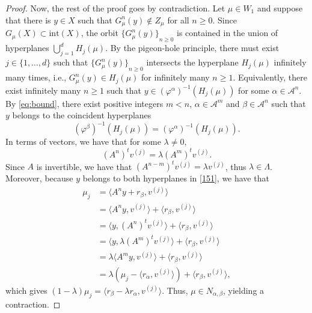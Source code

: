 \documentclass[12pt,reqno,a4paper]{amsart}%
\theoremstyle{definition}
\theoremstyle{remark}
\begin{document}
{\begin{proof}
Now, the rest of the proof goes by contradiction.  Let $\mu\in W_1$ and suppose that there is  $y\in X$ such that $G_\mu^n(y)\notin Z_\mu$ for all $n\geq0$.  Since $G_\mu(X)\subset \mathrm{int}(X)$,  the orbit ${\{G^n_\mu(y)\}}_{n\geq0}$ is contained in the union of hyperplanes $\bigcup_{j=1}^d H_j(\mu)$. By the pigeon-hole principle, there must exist $j\in\{1,\ldots,d\}$ such that ${\{G^n_\mu(y)\}}_{n\geq0}$ intersects the hyperplane $H_j(\mu)$ infinitely many times, i.e.,  $G^n_{\mu}(y)\in H_j(\mu)$ for infinitely many $n\geq1$.  Equivalently,  there exist infinitely many $n\ge 1$ such that $y\in (\varphi^{\alpha})^{-1}(H_j(\mu))$ for some $\alpha\in\mathcal{A}^n$.  By \eqref{eq:bound},  there exist positive integers $m<n$, $\alpha\in\mathcal{A}^{m}$ and $\beta\in\mathcal{A}^{n}$ such that $y$ belongs to the coincident hyperplanes 
\begin{equation}\label{151}
(\varphi^{\beta})^{-1}(H_j(\mu)) = (\varphi^{\alpha})^{-1}(H_j(\mu)).
\end{equation}
In terms of vectors, we have that for some $\lambda\neq 0$,
$$
(A^{n})^t v^{(j)} = \lambda (A^{m})^t v^{(j)}.
$$
Since $A$ is invertible, we have that 
$ (A^{n-m})^t v^{(j)} = \lambda v^{(j)}$, thus $\lambda\in \Lambda$.
Moreover,  because $y$ belongs to both hyperplanes in \eqref{151},  we have that
\begin{align*}
\mu_j &= \langle A^n y+r_\beta,v^{(j)}\rangle\\
&= \langle A^n y,v^{(j)}\rangle +\langle r_\beta,v^{(j)}\rangle\\
&= \langle y,(A^n)^t v^{(j)}\rangle +\langle r_\beta,v^{(j)}\rangle\\
&= \langle y,\lambda (A^{m})^t v^{(j)}\rangle +\langle r_\beta,v^{(j)}\rangle\\
&= \lambda \langle A^{m} y,  v^{(j)}\rangle +\langle r_\beta,v^{(j)}\rangle\\
&= \lambda (\mu_j-\langle r_\alpha, v^{(j)}\rangle) +\langle r_\beta,v^{(j)}\rangle,
\end{align*}
which gives $(1-\lambda)\mu_j= \langle r_\beta - \lambda r_\alpha,v^{(j)}\rangle$. Thus,  $\mu \in N_{\alpha,\beta}$,  yielding a contraction.  
\end{proof}









}
\end{document}
